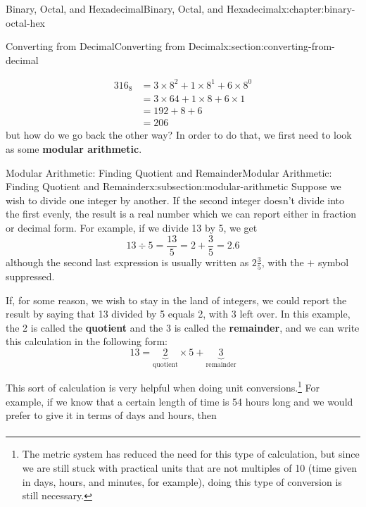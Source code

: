 \documentclass[twoside,10pt,]{book}
\newcommand{\terminology}[1]{\textbf{#1}}
\numberwithin{equation}{section}
\newcommand{\amp}{&}
\begin{document}
\begin{chapterptx}{Binary, Octal, and Hexadecimal}{}{Binary, Octal, and Hexadecimal}{}{}{x:chapter:binary-octal-hex}
\begin{sectionptx}{Converting from Decimal}{}{Converting from Decimal}{}{}{x:section:converting-from-decimal}
\begin{introduction}{}
\begin{align*}
316_8 \amp = 3\times8^2+1\times8^1+6\times8^0\\
\amp = 3\times64+1\times8+6\times1\\
\amp = 192+8+6\\
\amp=206
\end{align*}
but how do we go back the other way?  In order to do that, we first need to look as some \terminology{modular arithmetic}.\end{introduction}%
%
%
\typeout{************************************************}
\typeout{************************************************}
%
\begin{subsectionptx}{Modular Arithmetic: Finding Quotient and Remainder}{}{Modular Arithmetic: Finding Quotient and Remainder}{}{}{x:subsection:modular-arithmetic}
Suppose we wish to divide one integer by another. If the second integer doesn't divide into the first evenly, the result is a real number which we can report either in fraction or decimal form.  For example, if we divide 13 by 5, we get%
\begin{equation*}
13\div 5=\frac{13}{5}=2+\frac{3}{5}=2.6
\end{equation*}
although the second last expression is usually written as \(2\frac{3}{5}\), with the \(+\) symbol suppressed.%
\par
If, for some reason, we wish to stay in the land of integers, we could report the result by saying that 13 divided by 5 equals 2, with 3 left over.  In this example, the 2 is called the \terminology{quotient} and the 3 is called the \terminology{remainder}, and we can write this calculation in the following form: %
\begin{equation*}
13=\underbrace{2}_{\text{quotient}}\times 5 + \underbrace{3}_{\text{remainder}}
\end{equation*}
%
\par
This sort of calculation is very helpful when doing unit conversions.\footnote{The metric system has reduced the need for this type of calculation, but since we are still stuck with practical units that are not multiples of 10 (time given in days, hours, and minutes, for example), doing this type of conversion is still necessary.\label{g:fn:idp26045416}}  For example, if we know that a certain length of time is 54 hours long and we would prefer to give it in terms of days and hours, then%
\begin{align*}

\end{align*}
\end{subsectionptx}
\end{sectionptx}
\end{chapterptx}
\end{document}
